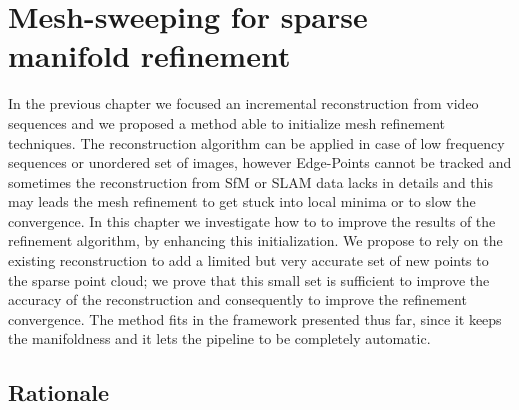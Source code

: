 \chapter[Mesh-sweeping for sparse manifold refinement]{Mesh-sweeping for sparse \\manifold refinement}
\label{ch:sweeping}

% 
In the previous chapter we focused an incremental reconstruction from video sequences and we proposed a method able to initialize mesh refinement techniques. 
The reconstruction algorithm can be applied in case of low frequency sequences or unordered set of images, however Edge-Points cannot be tracked and sometimes the reconstruction from SfM or SLAM data lacks in details and this may leads the mesh refinement to get stuck into local minima or to slow the convergence.
In this chapter we investigate how to to improve the results of the refinement algorithm, by enhancing this initialization. 
We propose to rely on the existing reconstruction to add a limited but very accurate set of new points to the sparse point cloud; we prove that this small set is sufficient to improve the accuracy of the reconstruction and consequently to improve the refinement convergence. 
The method fits in the framework presented thus far, since it keeps the manifoldness and it lets the pipeline to be completely automatic.

\minitoc
\newpage

\section{Rationale}


